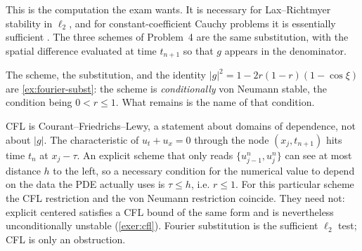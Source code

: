 \documentclass[11pt,a4paper]{article}
\begin{document}
This is the computation the exam wants. It is necessary for Lax--Richtmyer stability in \(\ell_2\), and for constant-coefficient Cauchy problems it is essentially sufficient \cite{gko95,leveque07}. The three schemes of Problem~4 are the same substitution, with the spatial difference evaluated at time \(t_{n+1}\) so that \(g\) appears in the denominator.

\begin{example}
\label{ex:explicit-upwind}
The scheme, the substitution, and the identity \(\lvert g\rvert^2=1-2r(1-r)(1-\cos\xi)\) are \cref{ex:fourier-subst}: the scheme is \emph{conditionally} von Neumann stable, the condition being \(0<r\le 1\). What remains is the name of that condition.

CFL is Courant--Friedrichs--Lewy, a statement about domains of dependence, not about \(\lvert g\rvert\). The characteristic of \(u_t+u_x=0\) through the node \((x_j,t_{n+1})\) hits time \(t_n\) at \(x_j-\tau\). An explicit scheme that only reads \(\{u_{j-1}^n,u_j^n\}\) can see at most distance \(h\) to the left, so a necessary condition for the numerical value to depend on the data the PDE actually uses is \(\tau\le h\), i.e. \(r\le 1\). For this particular scheme the CFL restriction and the von Neumann restriction coincide. They need not: explicit centered satisfies a CFL bound of the same form and is nevertheless unconditionally unstable (\cref{exer:cfl}). Fourier substitution is the sufficient \(\ell_2\) test; CFL is only an obstruction.
\end{example}
\end{document}
